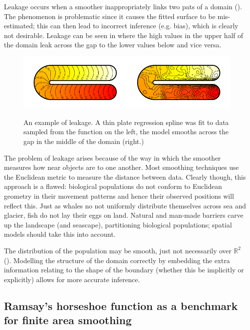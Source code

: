 Leakage occurs when a smoother inappropriately links two pats of a domain (\cite{soap}). The phenomenon is problematic since it causes the fitted surface to be mis-estimated; this can then lead to incorrect inference (e.g. bias), which is clearly not desirable. Leakage can be seen in  where the high values in the upper half of the domain leak across the gap to the lower values below and vice versa.

\begin{figure}
\centering
\includegraphics{intro/figs/ramsay-leak.pdf}\\
\caption{An example of leakage. A thin plate regression spline was fit to data sampled from the function on the left, the model smooths across the gap in the middle of the domain (right.)}
\label{leakage}
\end{figure}

The problem of leakage arises because of the way in which the smoother measures how near objects are to one another. Most smoothing techniques use the Euclidean metric to measure the distance between data. Clearly though, this approach is a flawed: biological populations do not conform to Euclidean geometry in their movement patterns and hence their observed positions will reflect this. Just as whales no not uniformly distribute themselves across sea and glacier, fish do not lay their eggs on land. Natural and man-made barriers carve up the landscape (and seascape), partitioning biological populations; spatial models should take this into account.

The distribution of the population may be smooth, just not necessarily over $\mathbb{R}^2$ (\cite{wangranalli}). Modelling the structure of the domain correctly by embedding the extra information relating to the shape of the boundary (whether this be implicitly or explicitly) allows for more accurate inference.

\subsection{Ramsay's horseshoe function as a benchmark for finite area smoothing}

